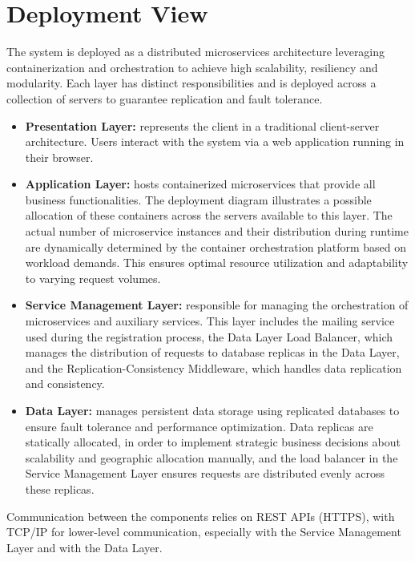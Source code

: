 \newpage

\section{Deployment View}
\label{sec: deployment_view}

The system is deployed as a distributed microservices architecture leveraging containerization and orchestration to achieve high scalability, resiliency and modularity. Each layer has distinct responsibilities and is deployed across a collection of servers to guarantee replication and fault tolerance.

\begin{itemize}
    \item \textbf{Presentation Layer:} represents the client in a traditional client-server architecture. Users interact with the system via a web application running in their browser.
    \item \textbf{Application Layer:} hosts containerized microservices that provide all business functionalities.
    The deployment diagram illustrates a possible allocation of these containers across the servers available to this layer. The actual number of microservice instances and their distribution during runtime are dynamically determined by the container orchestration platform based on workload demands. This ensures optimal resource utilization and adaptability to varying request volumes.
    \item \textbf{Service Management Layer:} responsible for managing the orchestration of microservices and auxiliary services. This layer includes the mailing service used during the registration process, the Data Layer Load Balancer, which manages the distribution of requests to database replicas in the Data Layer, and the Replication-Consistency Middleware, which handles data replication and consistency.
    \item \textbf{Data Layer:} manages persistent data storage using replicated databases to ensure fault tolerance and performance optimization. Data replicas are statically allocated, in order to implement strategic business decisions about scalability and geographic allocation manually, and the load balancer in the Service Management Layer ensures requests are distributed evenly across these replicas.
\end{itemize}

Communication between the components relies on REST APIs (HTTPS), with TCP/IP for lower-level communication, especially with the Service Management Layer and with the Data Layer.


